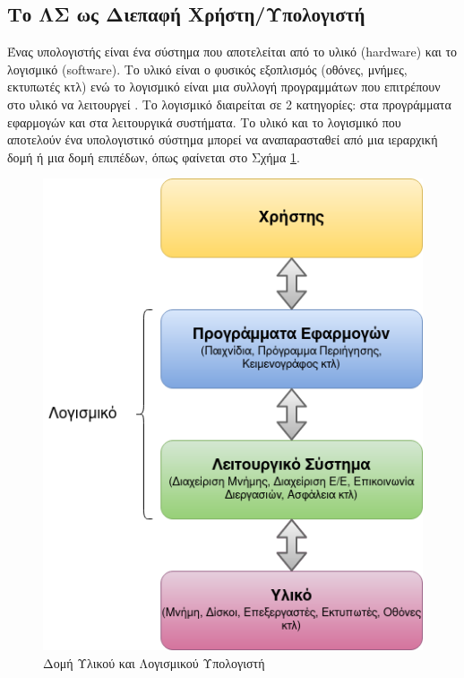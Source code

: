 \documentclass{report}
\begin{document}
\subsection{Το ΛΣ ως Διεπαφή Χρήστη/Υπολογιστή}
Ένας υπολογιστής είναι ένα σύστημα που αποτελείται από το υλικό ({hardware}) και το λογισμικό ({software}). Το υλικό είναι ο φυσικός εξοπλισμός (οθόνες, μνήμες, εκτυπωτές κτλ) ενώ το λογισμικό είναι μια συλλογή προγραμμάτων που επιτρέπουν στο υλικό να λειτουργεί \cite{forouzan}. Το λογισμικό διαιρείται σε 2 κατηγορίες: στα προγράμματα εφαρμογών και στα λειτουργικά συστήματα. Το υλικό και το λογισμικό που αποτελούν ένα υπολογιστικό σύστημα μπορεί να αναπαρασταθεί από μια ιεραρχική δομή ή μια δομή επιπέδων, όπως φαίνεται στο Σχήμα \ref{fig:os_hierarchy}.
\begin{figure}[t]
    \centering
    \includegraphics[scale=0.6]{images/OS_hierarchy.png}
    \caption{Δομή Υλικού και Λογισμικού Υπολογιστή}
    \label{fig:os_hierarchy}
\end{figure}
\end{document}

